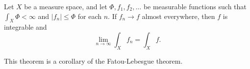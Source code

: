 \documentclass[12pt]{article}
\begin{document}
Let $X$ be a measure space, and let $\Phi,f_1,f_2,\dots$ be measurable functions such that $\int_X \Phi <\infty$ and $|f_n|\leq \Phi$ for each $n$. 
If $f_n\rightarrow f$ almost everywhere, then $f$ is integrable and 
\[ \lim_{n\rightarrow\infty} \int_X f_n =  \int_X f. \]

This theorem is a corollary of the Fatou-Lebesgue theorem.

\end{document}
